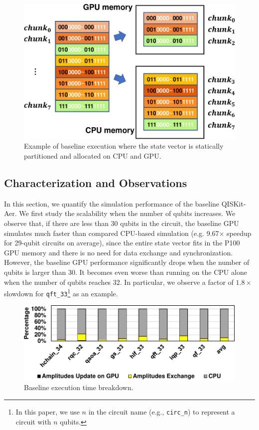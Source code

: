 \begin{figure}[h!]
\includegraphics[width=\textwidth]{Images/appendix2/section-3/chunk-egs.pdf}
\centering
\caption{Example of baseline execution where the state vector is statically partitioned and allocated on CPU and GPU.} %
\label{fig-3}
\vspace{-5pt}
\end{figure}

\subsection{Characterization and Observations}
\label{sec:observation}

In this section, we quantify the simulation performance of the baseline QISKit-Aer.
We first study the scalability when the number of qubits increases. We observe that, if there are less than 30 qubits in the circuit, the baseline GPU simulates much faster than compared CPU-based simulation (e.g. 9.67$\times$ speedup for 29-qubit circuits on average), since the entire state vector fits in the P100 GPU memory and there is no need for data exchange and synchronization. However, the baseline GPU performance significantly drops when the number of qubits is larger than 30. It becomes even worse than running on the CPU alone when the number of qubits reaches 32. In particular, we observe a factor of $1.8\times$ slowdown for {\tt qft\_33}\footnote{In this paper, we use $n$ in the circuit name (e.g., {\tt circ\_n}) to represent a circuit with $n$ qubits.} as an example. 

\begin{figure}[h!]
\includegraphics[width=\textwidth]{Images/appendix2/section-3/baseline-breakdown.pdf}
\caption{Baseline execution time breakdown.}
\label{fig:basebreak}
\vspace{-5pt}
\end{figure}

